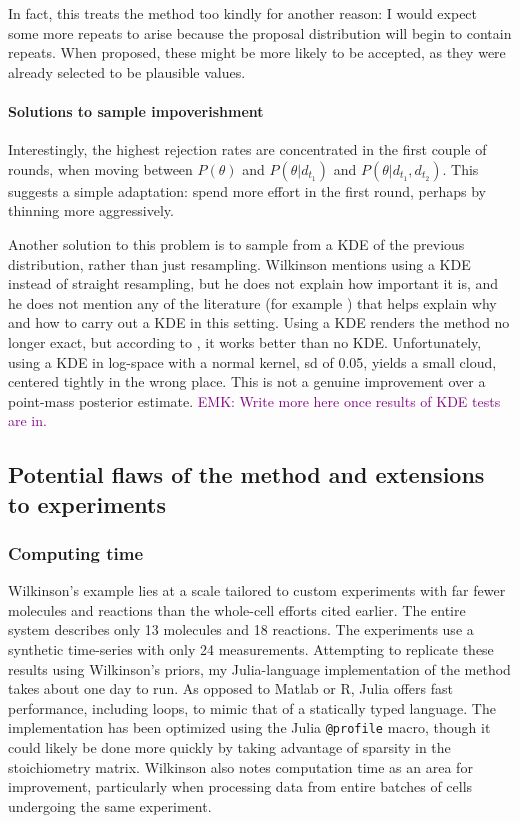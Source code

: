 \documentclass{article}
\newcommand\EMK[1]{\textcolor{purple}{EMK: #1}}
\begin{document}
In fact, this treats the method too kindly for another reason: I would expect some more repeats to arise because the proposal distribution will begin to contain repeats. When proposed, these might be more likely to be accepted, as they were already selected to be plausible values. 

\paragraph{Solutions to sample impoverishment}
Interestingly, the highest rejection rates are concentrated in the first couple of rounds, when moving between $P(\theta)$ and $P(\theta|d_{t_1})$ and $P(\theta|d_{t_1}, d_{t_2})$. This suggests a simple adaptation: spend more effort in the first round, perhaps by thinning more aggressively.

Another solution to this problem is to sample from a KDE of the previous distribution, rather than just resampling. Wilkinson mentions using a KDE instead of straight resampling, but he does not explain how important it is, and he does not mention any of the literature (for example \cite{particle_filter_tutorial}) that helps explain why and how to carry out a KDE in this setting.  Using a KDE renders the method no longer exact, but according to \cite{particle_filter_tutorial}, it works better than no KDE. %
Unfortunately, using a KDE in log-space with a normal kernel, sd of 0.05, yields a small cloud, centered tightly in the wrong place. This is not a genuine improvement over a point-mass posterior estimate. \EMK{Write more here once results of KDE tests are in.}


\subsection{Potential flaws of the method and extensions to experiments}

\subsubsection{Computing time}
Wilkinson's example lies at a scale tailored to custom experiments with far fewer molecules and reactions than the whole-cell efforts cited earlier. The entire system describes only 13 molecules and 18 reactions. The experiments use a synthetic time-series with only 24 measurements. Attempting to replicate these results using Wilkinson's priors, my Julia-language implementation of the method takes about one day to run. As opposed to Matlab or R, Julia offers fast performance, including loops, to mimic that of a statically typed language. The implementation has been optimized using the Julia \texttt{@profile} macro, though it could likely be done more quickly by taking advantage of sparsity in the stoichiometry matrix. Wilkinson also notes computation time as an area for improvement, particularly when processing data from entire batches of cells undergoing the same experiment.
\end{document}
